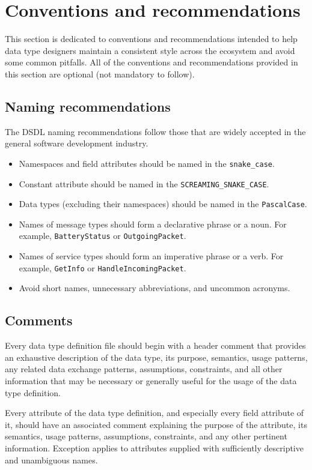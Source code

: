 \section{Conventions and recommendations}

This section is dedicated to conventions and recommendations
intended to help data type designers maintain a consistent style across the ecosystem
and avoid some common pitfalls.
All of the conventions and recommendations provided in this section are optional (not mandatory to follow).

\subsection{Naming recommendations}

The DSDL naming recommendations follow those that are widely accepted in the general software development industry.

\begin{itemize}
    \item Namespaces and field attributes should be named in the \verb|snake_case|.
    \item Constant attribute should be named in the \verb|SCREAMING_SNAKE_CASE|.
    \item Data types (excluding their namespaces) should be named in the \verb|PascalCase|.
    \item Names of message types should form a declarative phrase or a noun. For example,
    \verb|BatteryStatus| or \verb|OutgoingPacket|.
    \item Names of service types should form an imperative phrase or a verb. For example,
    \verb|GetInfo| or \verb|HandleIncomingPacket|.
    \item Avoid short names, unnecessary abbreviations, and uncommon acronyms.
\end{itemize}

\subsection{Comments}

Every data type definition file should begin with a header comment that provides an exhaustive description
of the data type, its purpose, semantics, usage patterns, any related data exchange patterns,
assumptions, constraints, and all other information that may be necessary or generally useful for the usage of the
data type definition.

Every attribute of the data type definition, and especially every field attribute of it,
should have an associated comment explaining the purpose of the attribute, its semantics, usage patterns,
assumptions, constraints, and any other pertinent information.
Exception applies to attributes supplied with sufficiently descriptive and unambiguous names.

